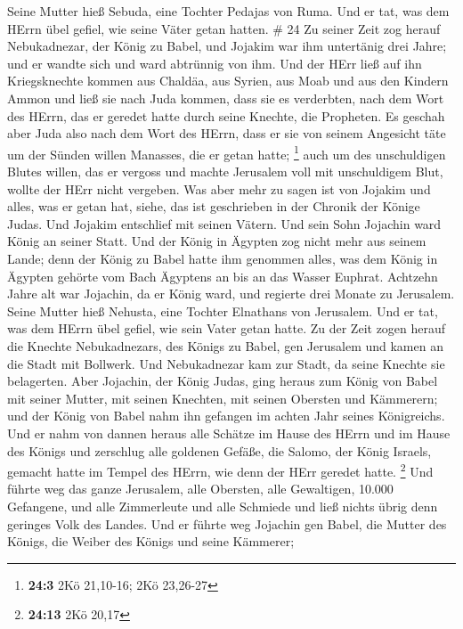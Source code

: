 Seine Mutter hieß Sebuda, eine Tochter Pedajas von Ruma. 
Und er tat, was dem HErrn übel gefiel, wie seine Väter getan hatten. \#
24  Zu seiner Zeit zog herauf Nebukadnezar, der König zu
Babel, und Jojakim war ihm untertänig drei Jahre; und er wandte sich und
ward abtrünnig von ihm.  Und der HErr ließ auf ihn
Kriegsknechte kommen aus Chaldäa, aus Syrien, aus Moab und aus den
Kindern Ammon und ließ sie nach Juda kommen, dass sie es verderbten,
nach dem Wort des HErrn, das er geredet hatte durch seine Knechte, die
Propheten.  Es geschah aber Juda also nach dem Wort des
HErrn, dass er sie von seinem Angesicht täte um der Sünden willen
Manasses, die er getan hatte; \footnote{\textbf{24:3} 2Kö 21,10-16; 2Kö
  23,26-27}  auch um des unschuldigen Blutes willen, das er
vergoss und machte Jerusalem voll mit unschuldigem Blut, wollte der HErr
nicht vergeben.  Was aber mehr zu sagen ist von Jojakim und
alles, was er getan hat, siehe, das ist geschrieben in der Chronik der
Könige Judas.  Und Jojakim entschlief mit seinen Vätern. Und
sein Sohn Jojachin ward König an seiner Statt.  Und der
König in Ägypten zog nicht mehr aus seinem Lande; denn der König zu
Babel hatte ihm genommen alles, was dem König in Ägypten gehörte vom
Bach Ägyptens an bis an das Wasser Euphrat.  Achtzehn Jahre
alt war Jojachin, da er König ward, und regierte drei Monate zu
Jerusalem. Seine Mutter hieß Nehusta, eine Tochter Elnathans von
Jerusalem.  Und er tat, was dem HErrn übel gefiel, wie sein
Vater getan hatte.  Zu der Zeit zogen herauf die Knechte
Nebukadnezars, des Königs zu Babel, gen Jerusalem und kamen an die Stadt
mit Bollwerk.  Und Nebukadnezar kam zur Stadt, da seine
Knechte sie belagerten.  Aber Jojachin, der König Judas,
ging heraus zum König von Babel mit seiner Mutter, mit seinen Knechten,
mit seinen Obersten und Kämmerern; und der König von Babel nahm ihn
gefangen im achten Jahr seines Königreichs.  Und er nahm
von dannen heraus alle Schätze im Hause des HErrn und im Hause des
Königs und zerschlug alle goldenen Gefäße, die Salomo, der König
Israels, gemacht hatte im Tempel des HErrn, wie denn der HErr geredet
hatte. \footnote{\textbf{24:13} 2Kö 20,17}  Und führte weg
das ganze Jerusalem, alle Obersten, alle Gewaltigen, 10.000 Gefangene,
und alle Zimmerleute und alle Schmiede und ließ nichts übrig denn
geringes Volk des Landes.  Und er führte weg Jojachin gen
Babel, die Mutter des Königs, die Weiber des Königs und seine Kämmerer;
